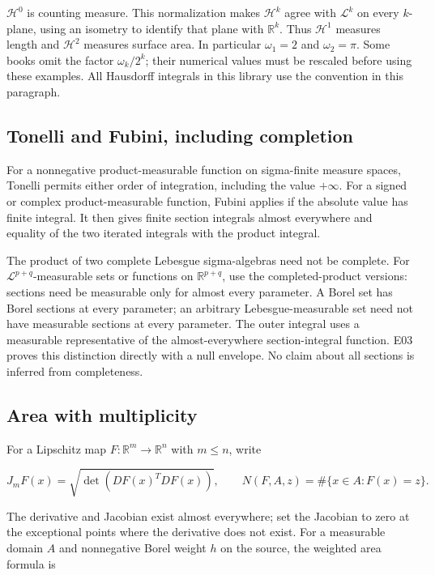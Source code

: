 \documentclass[
  11pt,
]{article}
\begin{document}
\(\mathcal H^0\) is counting measure. This normalization makes
\(\mathcal H^k\) agree with \(\mathcal L^k\) on every \(k\)-plane, using
an isometry to identify that plane with \(\mathbb R^k\). Thus
\(\mathcal H^1\) measures length and \(\mathcal H^2\) measures surface
area. In particular \(\omega_1=2\) and \(\omega_2=\pi\). Some books omit
the factor \(\omega_k/2^k\); their numerical values must be rescaled
before using these examples. All Hausdorff integrals in this library use
the convention in this paragraph.

\subsection{Tonelli and Fubini, including
completion}\label{tonelli-and-fubini-including-completion}

For a nonnegative product-measurable function on sigma-finite measure
spaces, Tonelli permits either order of integration, including the value
\(+\infty\). For a signed or complex product-measurable function, Fubini
applies if the absolute value has finite integral. It then gives finite
section integrals almost everywhere and equality of the two iterated
integrals with the product integral.

The product of two complete Lebesgue sigma-algebras need not be
complete. For \(\mathcal L^{p+q}\)-measurable sets or functions on
\(\mathbb R^{p+q}\), use the completed-product versions: sections need
be measurable only for almost every parameter. A Borel set has Borel
sections at every parameter; an arbitrary Lebesgue-measurable set need
not have measurable sections at every parameter. The outer integral uses
a measurable representative of the almost-everywhere section-integral
function. E03 proves this distinction directly with a null envelope. No
claim about all sections is inferred from completeness.

\subsection{Area with multiplicity}\label{area-with-multiplicity}

For a Lipschitz map \(F:\mathbb R^m\to\mathbb R^n\) with \(m\leq n\),
write

\[
J_mF(x)=\sqrt{\det(DF(x)^TDF(x))},\qquad
N(F,A,z)=\#\{x\in A:F(x)=z\}.
\]

The derivative and Jacobian exist almost everywhere; set the Jacobian to
zero at the exceptional points where the derivative does not exist. For
a measurable domain \(A\) and nonnegative Borel weight \(h\) on the
source, the weighted area formula is
\end{document}
